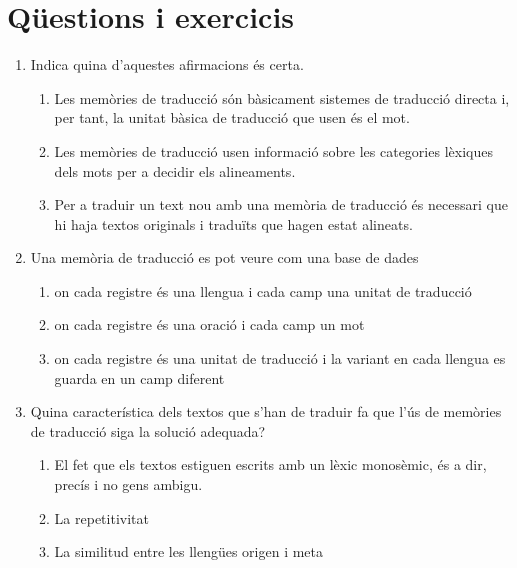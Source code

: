 \section{Qüestions i exercicis}

\begin{enumerate}
\item Indica quina d'aquestes afirmacions és certa.
\begin{enumerate}
\item Les memòries de traducció són bàsicament sistemes de
     traducció directa i, per tant, la unitat bàsica de traducció que
     usen és el mot.
\item Les memòries de traducció usen informació sobre les
     categories lèxiques dels mots per a decidir els alineaments.
\item Per a traduir un text nou amb una memòria de traducció
     és necessari que hi haja textos
     originals i traduïts que hagen estat alineats.
\end{enumerate}

\item Una memòria de traducció es pot veure com una base de dades 
   
\begin{enumerate}
\item on cada registre és una llengua i cada camp una unitat de
      traducció
\item on cada registre és una oració i cada camp un mot
\item on cada registre és una unitat de traducció i la variant en
      cada llengua es guarda en un camp diferent
\end{enumerate}

\item Quina característica dels textos que s'han de traduir fa que
   l'ús de memòries de traducció siga la solució adequada?
   
\begin{enumerate}
\item El fet que els textos estiguen escrits amb un lèxic
      monosèmic, és a dir, precís i no gens ambigu.
\item La repetitivitat
\item La similitud entre les llengües origen i meta
\end{enumerate}


\end{enumerate}
